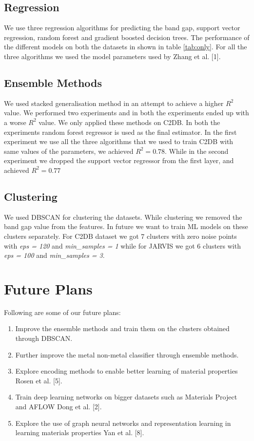 \documentclass{article}
\begin{document}
\subsection{Regression}

We use three regression algorithms for predicting the band gap, support vector regression, random forest and gradient boosted decision trees. The performance of the different models on both the datasets in shown in table \ref{tab:only}. For all the three algorithms we used the model parameters used by Zhang et al. [1].

\subsection{Ensemble Methods}

We used stacked generalisation method in an attempt to achieve a higher $R^2$ value. We performed two experiments and in both the experiments ended up with a worse $R^2$ value. We only applied these methods on C2DB. In both the experiments random forest regressor is used as the final estimator. In the first experiment we use all the three algorithms that we used to train C2DB with same values of the parameters, we achieved $R^2 = 0.78$. While in the second experiment we dropped the support vector regressor from the first layer, and achieved $R^2 = 0.77$

\subsection{Clustering}

We used DBSCAN for clustering the datasets. While clustering we removed the band gap value from the features. In future we want to train ML models on these clusters separately. For C2DB dataset we got $7$ clusters with zero noise points with \emph{eps = 120} and \emph{min\_samples = 1} while for JARVIS we got $6$ clusters with \emph{eps = 100} and \emph{min\_samples = 3}.

\section{Future Plans}

Following are some of our future plans:
\begin{enumerate}
	\item Improve the ensemble methods and train them on the clusters obtained through DBSCAN.
	\item Further improve the metal non-metal classifier through ensemble methods. 
	\item Explore encoding methods to enable better learning of material properties Rosen et al. [5].
	\item Train deep learning networks on bigger datasets such as Materials Project and AFLOW Dong et al. [2].
	\item Explore the use of graph neural networks and representation learning in learning materials properties Yan et al. [8]. 
\end{enumerate}
\end{document}
